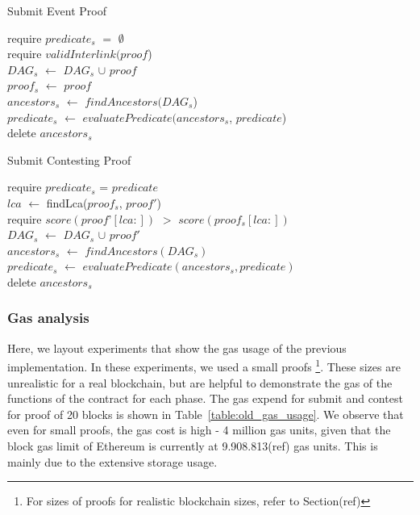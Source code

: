 \begin{algorithm}
    \caption{Submit Event Proof}
    \label{algo:submit_old}
    require $predicate_{s}$ $=$ $\emptyset$ \\
    require $validInterlink(proof$) \\
    $DAG_{s}$ $\leftarrow$ $DAG_{s}$ $\cup$ $proof$\\
    $proof_{s}$ $\leftarrow$ $proof$\\
    $ancestors_{s}$ $\leftarrow$ $findAncestors(DAG_{s}$)\\
    $predicate_{s}$ $\leftarrow$ $evaluatePredicate(ancestors_{s}$,
    $predicate$)\\
    delete $ancestors_{s}$\\
\end{algorithm}

\begin{algorithm}
    \caption{Submit Contesting Proof}
    \label{algo:contest_old}
    require $predicate_{s}$ = $predicate$\\
    $lca$ $\leftarrow$ findLca($proof_{s}$, $proof'$)\\
    require $score(proof’[lca:])$ $>$ $score(proof_{s}[lca:])$ \\
    $DAG_{s}$ $\leftarrow$ $DAG_{s}$ $\cup$ $proof'$\\
    $ancestors_{s}$ $\leftarrow$ $findAncestors(DAG_{s})$\\
    $predicate_{s}$ $\leftarrow$ $evaluatePredicate(ancestors_{s},
    predicate)$\\
    delete $ancestors_{s}$\\
\end{algorithm}

\subsubsection{Gas analysis}

Here, we layout experiments that show the gas usage of the previous
implementation. In these experiments, we used a small proofs \footnote{For
sizes of proofs for realistic blockchain sizes, refer to Section(ref)}. These
sizes are unrealistic for a real blockchain, but are helpful to demonstrate the
gas of the functions of the contract for each phase. The gas expend for submit
and contest for proof of 20 blocks is shown in Table~\ref{table:old_gas_usage}.
We observe that even for small proofs, the gas cost is high - 4 million gas
units, given that the block gas limit of Ethereum is currently at
9.908.813(ref) gas units. This is mainly due to the extensive storage usage.

